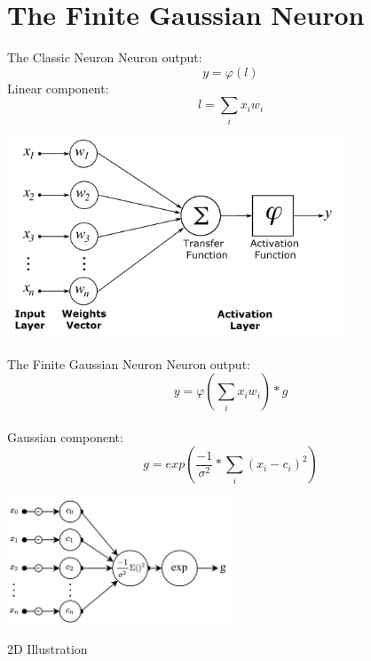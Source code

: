 \documentclass{beamer}
\begin{document}
\section{The Finite Gaussian Neuron}
\begin{frame}{The Classic Neuron}
Neuron output: 
$$y = \varphi(l)$$
Linear component:
$$l=\sum_i x_i w_i$$

\begin{center}
    \includegraphics[width=0.75\textwidth]{images/artificial_neuron_model.png}
\end{center}
\end{frame}

\begin{frame}{The Finite Gaussian Neuron}
Neuron output:
$$ y = \varphi(\sum_i x_i w_i) * g$$ \\ 
Gaussian component:
$$ g = exp \left( \frac{-1}{\sigma^2}*\sum_{i}(x_i-c_i)^2 \right)$$

\begin{center}
    \includegraphics[width=0.5\textwidth]{images/fgn-gaussian-component.png}
\end{center}

\end{frame}

\begin{frame}{2D Illustration}

\end{frame}
\end{document}
